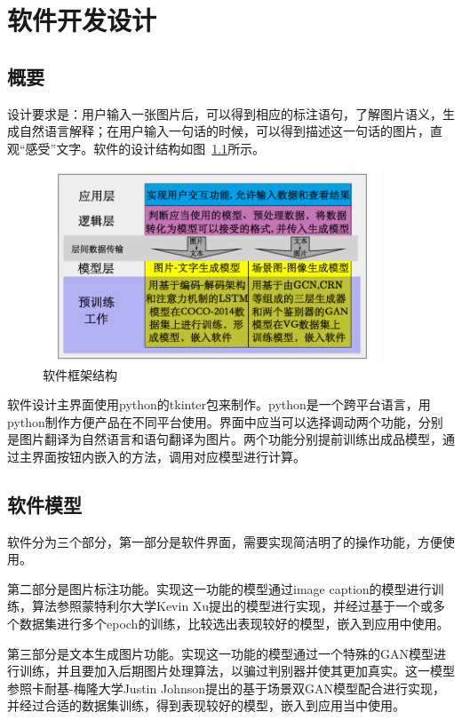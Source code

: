
\chapter{软件开发设计}

\section{概要}
设计要求是：用户输入一张图片后，可以得到相应的标注语句，了解图片语义，生成自然语言解释；在用户输入一句话的时候，可以得到描述这一句话的图片，直观“感受”文字。软件的设计结构如图~\ref{fig:struct}所示。

\begin{figure}[!htbp]
    \centering
    \includegraphics[width=0.9\textwidth]{figures/软件框架.png}
    \caption{软件框架结构}
    \label{fig:struct}
\end{figure}

软件设计主界面使用python的tkinter包来制作。python是一个跨平台语言，用python制作方便产品在不同平台使用。界面中应当可以选择调动两个功能，分别是图片翻译为自然语言和语句翻译为图片。两个功能分别提前训练出成品模型，通过主界面按钮内嵌入的方法，调用对应模型进行计算。

\section{软件模型}
软件分为三个部分，第一部分是软件界面，需要实现简洁明了的操作功能，方便使用。

第二部分是图片标注功能。实现这一功能的模型通过image caption的模型进行训练，算法参照蒙特利尔大学Kevin Xu提出的模型进行实现，并经过基于一个或多个数据集进行多个epoch的训练，比较选出表现较好的模型，嵌入到应用中使用。

第三部分是文本生成图片功能。实现这一功能的模型通过一个特殊的GAN模型进行训练，并且要加入后期图片处理算法，以骗过判别器并使其更加真实。这一模型参照卡耐基-梅隆大学Justin Johnson提出的基于场景双GAN模型配合进行实现，并经过合适的数据集训练，得到表现较好的模型，嵌入到应用当中使用。

